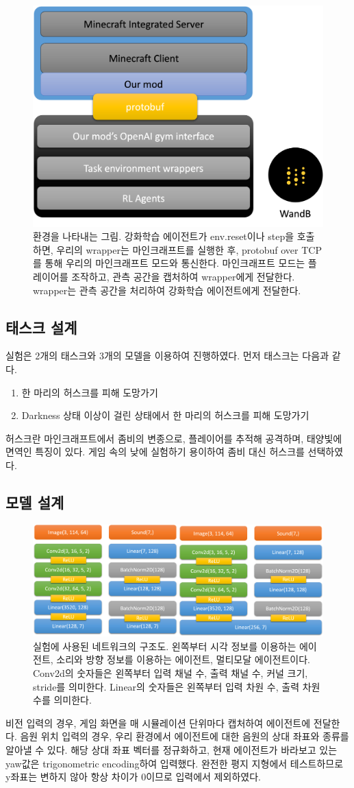 \documentclass{tudelftposter}
\begin{document}
\begin{figure}
  \centering
  \includegraphics[width=.3\textwidth]{arch1.png}
  \caption{환경을 나타내는 그림. 강화학습 에이전트가 env.reset이나 step을 호출하면, 우리의 wrapper는 마인크래프트를 실행한 후, protobuf over TCP를 통해 우리의 마인크래프트 모드와 통신한다. 마인크래프트 모드는 플레이어를 조작하고, 관측 공간을 캡처하여 wrapper에게 전달한다. wrapper는 관측 공간을 처리하여 강화학습 에이전트에게 전달한다.}
  \label{fig:test}
\end{figure}


\subsection{태스크 설계}
실험은 2개의 태스크와 3개의 모델을 이용하여 진행하였다. 먼저 태스크는 다음과 같다. 
\begin{enumerate}
  \item 한 마리의 허스크를 피해 도망가기
  \item Darkness 상태 이상이 걸린 상태에서 한 마리의 허스크를 피해 도망가기
\end{enumerate}
허스크란 마인크래프트에서 좀비의 변종으로, 플레이어를 추적해 공격하며, 태양빛에 면역인 특징이 있다. 게임 속의 낮에 실험하기 용이하여 좀비 대신 허스크를 선택하였다.

\subsection{모델 설계}
\begin{figure}
  \centering
  \includegraphics[width=.4\textwidth]{models.png}
  \caption{실험에 사용된 네트워크의 구조도. 왼쪽부터 시각 정보를 이용하는 에이전트, 소리와 방향 정보를 이용하는 에이전트, 멀티모달 에이전트이다. Conv2d의 숫자들은 왼쪽부터 입력 채널 수, 출력 채널 수, 커널 크기, stride를 의미한다. Linear의 숫자들은 왼쪽부터 입력 차원 수, 출력 차원 수를 의미한다.}
  \label{fig:models}
\end{figure}
비전 입력의 경우, 게임 화면을 매 시뮬레이션 단위마다 캡처하여 에이전트에 전달한다. 음원 위치 입력의 경우, 우리 환경에서 에이전트에 대한 음원의 상대 좌표와 종류를 알아낼 수 있다. 해당 상대 좌표 벡터를 정규화하고, 현재 에이전트가 바라보고 있는 yaw값은 trigonometric encoding하여 입력했다. 완전한 평지 지형에서 테스트하므로 y좌표는 변하지 않아 항상 차이가 0이므로 입력에서 제외하였다. 
\end{document}

